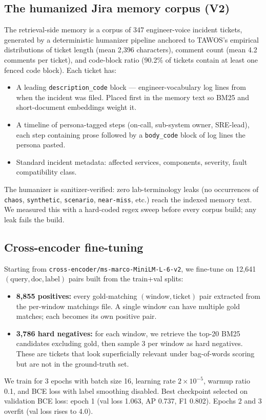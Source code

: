 \subsection{The humanized Jira memory corpus (V2)}
\label{sec:corpus}

The retrieval-side memory is a corpus of 347 engineer-voice incident tickets, generated by a deterministic humanizer pipeline anchored to \textsc{TAWOS}'s empirical distributions of ticket length (mean 2{,}396 characters), comment count (mean 4.2 comments per ticket), and code-block ratio (90.2\% of tickets contain at least one fenced code block). Each ticket has:

\begin{itemize}
    \item A leading \texttt{description\_code} block --- engineer-vocabulary log lines from when the incident was filed. Placed first in the memory text so BM25 and short-document embeddings weight it.
    \item A timeline of persona-tagged steps (on-call, sub-system owner, SRE-lead), each step containing prose followed by a \texttt{body\_code} block of log lines the persona pasted.
    \item Standard incident metadata: affected services, components, severity, fault compatibility class.
\end{itemize}

The humanizer is sanitizer-verified: zero lab-terminology leaks (no occurrences of \texttt{chaos}, \texttt{synthetic}, \texttt{scenario}, \texttt{near-miss}, etc.) reach the indexed memory text. We measured this with a hard-coded regex sweep before every corpus build; any leak fails the build.

\subsection{Cross-encoder fine-tuning}

Starting from \texttt{cross-encoder/ms-marco-MiniLM-L-6-v2}, we fine-tune on 12{,}641 $(\text{query}, \text{doc}, \text{label})$ pairs built from the train+val splits:

\begin{itemize}
    \item \textbf{8{,}855 positives:} every gold-matching $(\text{window}, \text{ticket})$ pair extracted from the per-window matchings file. A single window can have multiple gold matches; each becomes its own positive pair.
    \item \textbf{3{,}786 hard negatives:} for each window, we retrieve the top-20 BM25 candidates excluding gold, then sample 3 per window as hard negatives. These are tickets that look superficially relevant under bag-of-words scoring but are not in the ground-truth set.
\end{itemize}

We train for 3 epochs with batch size 16, learning rate $2 \times 10^{-5}$, warmup ratio 0.1, and BCE loss with label smoothing disabled. Best checkpoint selected on validation BCE loss: epoch 1 (val loss 1.063, AP 0.737, F1 0.802). Epochs 2 and 3 overfit (val loss rises to 4.0).
